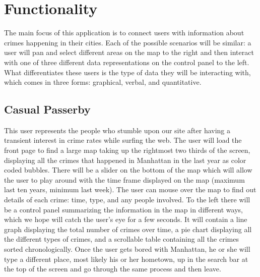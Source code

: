 \documentclass[paper=a4, fontsize=11pt]{scrartcl} %
\numberwithin{equation}{section} %
\numberwithin{figure}{section} %
\numberwithin{table}{section} %
\begin{document}

\section{Functionality}

The main focus of this application is to connect users with information about crimes happening in their cities. Each of the possible scenarios will be similar: a user will pan and select different areas on the map to the right and then interact with one of three different data representations on the control panel to the left. What differentiates these users is the type of data they will be interacting with, which comes in three forms: graphical, verbal, and quantitative.  


\subsection{Casual Passerby}

This user represents the people who stumble upon our site after having a transient interest in crime rates while surfing the web. The user will load the front page to find a large map taking up the rightmost two thirds of the screen, displaying all the crimes that happened in Manhattan in the last year as color coded bubbles. There will be a slider on the bottom of the map which will allow the user to play around with the time frame displayed on the map (maximum last ten years, minimum last week). The user can mouse over the map to find out details of each crime: time, type, and any people involved. To the left there will be a control panel summarizing the information in the map in different ways, which we hope will catch the user's eye for a few seconds. It will contain a line graph displaying the total number of crimes over time, a pie chart displaying all the different types of crimes, and a scrollable table containing all the crimes sorted chronologically. Once the user gets bored with Manhattan, he or she will type a different place, most likely his or her hometown, up in the search bar at the top of the screen and go through the same process and then leave.

\end{document}

